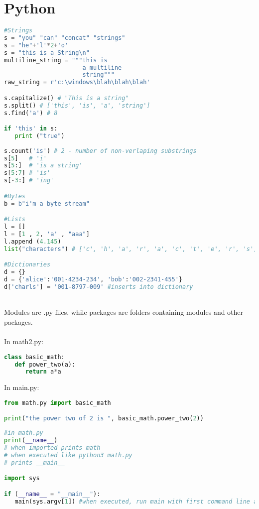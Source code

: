 \chapter{Python}

\begin{note}
\begin{lstlisting}[language = {python}]
#Strings
s = "you" "can" "concat" "strings"
s = "he"+'l'*2+'o'
s = "this is a String\n"
multiline_string = """this is 
                      a multiline 
                      string"""
raw_string = r'c:\windows\blah\blah\blah'

s.capitalize() # "This is a string"
s.split() # ['this', 'is', 'a', 'string']
s.find('a') # 8

if 'this' in s:
   print ("true")
   
s.count('is') # 2 - number of non-verlaping substrings
s[5]   # 'i'
s[5:]  # 'is a string'
s[5:7] # 'is'
s[-3:] # 'ing'

#Bytes
b = b"i'm a byte stream"

#Lists
l = []
l = [1 , 2, 'a' , "aaa"]
l.append (4.145)
list("characters") # ['c', 'h', 'a', 'r', 'a', 'c', 't', 'e', 'r', 's']

#Dictionaries
d = {}
d = {'alice':'001-4234-234', 'bob':'002-2341-455'}
d['charls'] = '001-8797-009' #inserts into dictionary
\end{lstlisting}
\end{note}
\begin{note}[Modularity]\\
	Modules are .py files, while packages are folders containing modules and other packages.
	\\
	\\
In math2.py:
\begin{lstlisting}[language = {python}]
class basic_math:
   def power_two(a):
      return a*a
\end{lstlisting}
In main.py:
\begin{lstlisting}[language = {python}]
from math.py import basic_math

print("the power two of 2 is ", basic_math.power_two(2))
\end{lstlisting}
\end{note}
\begin{note}
\begin{lstlisting}[language = {python}]
#in math.py
print(__name__)
# when imported prints math
# when executed like python3 math.py
# prints __main__

import sys

if (__name__ = "__main__"):
   main(sys.argv[1]) #when executed, run main with first command line argument
\end{lstlisting}
\end{note}


